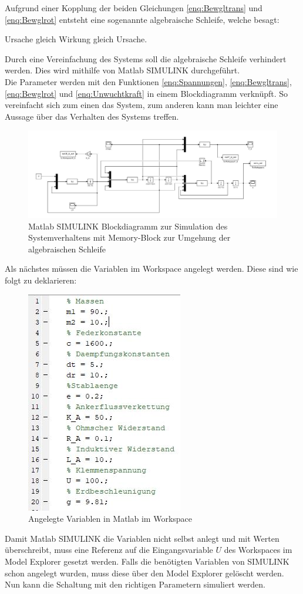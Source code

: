 Aufgrund einer Kopplung der beiden Gleichungen \ref{enq:Bewgltrans} und \ref{enq:Bewglrot} entsteht eine sogenannte algebraische Schleife, welche besagt:

\begin{center}
	Ursache gleich Wirkung gleich Ursache. \cite[S. 64]{HelmutBode.}
\end{center}

Durch eine Vereinfachung des Systems soll die algebraische Schleife verhindert werden. Dies wird mithilfe von Matlab SIMULINK durchgeführt. \\
Die Parameter werden mit den Funktionen \ref{enq:Spannungen}, \ref{enq:Bewgltrans}, \ref{enq:Bewglrot} und \ref{enq:Unwuchtkraft} in einem Blockdiagramm verknüpft. So vereinfacht sich zum einen das System, zum anderen kann man leichter eine Aussage über das Verhalten des Systems treffen.

\begin{figure}[hbt]
	\centering
	\includegraphics[width=1\linewidth]{Images/ProjektB_Elektrik_Blockdiagramm}
	\caption{Matlab SIMULINK Blockdiagramm zur Simulation des Systemverhaltens mit Memory-Block zur Umgehung der algebraischen Schleife}
	\label{fig:Blockdiagramm}
\end{figure}

\newpage

Als nächstes müssen die Variablen im Workspace angelegt werden. Diese sind wie folgt zu deklarieren: \\

\begin{figure}[hbt]
	\centering
	\includegraphics[width=0.3\linewidth]{Images/Variablen}
	\caption{Angelegte Variablen in Matlab im Workspace}
	\label{fig:Variablen}
\end{figure}

Damit Matlab SIMULINK die Variablen nicht selbst anlegt und mit Werten überschreibt, muss eine Referenz auf die Eingangsvariable $U$ des Workspaces im Model Explorer gesetzt werden. Falls die benötigten Variablen von SIMULINK schon angelegt wurden, muss diese über den Model Explorer gelöscht werden. Nun kann die Schaltung mit den richtigen Parametern simuliert werden.